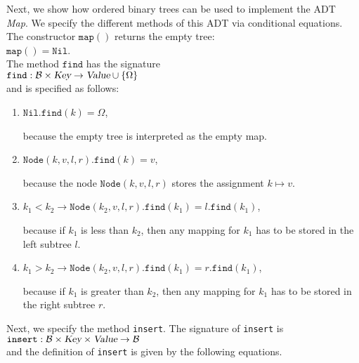 Next, we show how ordered binary trees can be used to implement the ADT  \textsl{Map}.  We specify
the different methods of this ADT via conditional equations.  The constructor $\texttt{map}()$
returns the empty tree:
\\[0.2cm]
\hspace*{1.3cm}
$\texttt{map}() = \texttt{Nil}$. 
\\[0.2cm]
The  method $\texttt{find}$ has the signature 
\\[0.2cm]
\hspace*{1.3cm}
$\texttt{find}:\mathcal{B} \times \textsl{Key} \rightarrow \textsl{Value} \cup \{ \Omega \}$
\\[0.2cm]
and is specified as follows:
\begin{enumerate}
\item $\texttt{Nil}.\texttt{find}(k) = \Omega$,

      because the empty tree is interpreted as the empty map.
\item $\texttt{Node}(k, v, l, r).\texttt{find}(k) = v$,

      because the node $\texttt{Node}(k,v,l,r)$ stores the assignment $k \mapsto v$.
\item $k_1 < k_2 \rightarrow \texttt{Node}(k_2, v, l, r).\texttt{find}(k_1) = l.\texttt{find}(k_1)$,

      because if $k_1$ is less than $k_2$, then any mapping for $k_1$ has to be stored in the left
      subtree  $l$.
\item $k_1 > k_2 \rightarrow \texttt{Node}(k_2, v, l, r).\texttt{find}(k_1) = r.\texttt{find}(k_1)$,

      because if $k_1$ is greater than $k_2$, then any mapping for $k_1$ has to be stored in the right
      subtree  $r$.
\end{enumerate}
Next, we specify the method  \texttt{insert}.  The signature of \texttt{insert} is
\\[0.2cm]
\hspace*{1.3cm}
$\texttt{insert}: \mathcal{B} \times \textsl{Key} \times \textsl{Value} \rightarrow \mathcal{B}$
\\[0.2cm]
and the definition of \texttt{insert} is given by the following equations.
